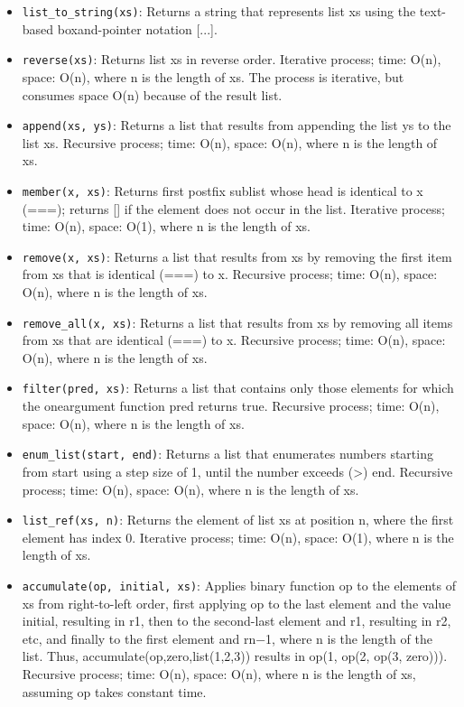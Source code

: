 \documentclass[a4paper]{article} \usepackage[backend=biber, style=numeric, sorting=none]{biblatex}
\begin{document}
\begin{multicols*}{4}
\begin{itemize}
\item \texttt{list\_to\_string(xs)}: Returns a string that represents list xs using the text-based boxand-pointer notation [...].
\item \texttt{reverse(xs)}: Returns list xs in reverse order. Iterative process; time: O(n), space: O(n), where n is the length of xs. The process is iterative, but consumes space O(n) because of the result list.
\item \texttt{append(xs, ys)}: Returns a list that results from appending the list ys to the list xs. Recursive process; time: O(n), space: O(n), where n is the length of xs.
\item \texttt{member(x, xs)}: Returns first postfix sublist whose head is identical to x (===); returns [] if the element does not occur in the list. Iterative process; time: O(n), space: O(1), where n is the length of xs.
\item \texttt{remove(x, xs)}: Returns a list that results from xs by removing the first item from xs that is identical (===) to x. Recursive process; time: O(n), space: O(n), where n is the length of xs.
\item \texttt{remove\_all(x, xs)}: Returns a list that results from xs by removing all items from xs that are identical (===) to x. Recursive process; time: O(n), space: O(n), where n is the length of xs.
\item \texttt{filter(pred, xs)}: Returns a list that contains only those elements for which the oneargument function pred returns true. Recursive process; time: O(n), space: O(n), where n is the length of xs.
\item \texttt{enum\_list(start, end)}: Returns a list that enumerates numbers starting from start using a step size of 1, until the number exceeds (>) end. Recursive process; time: O(n), space: O(n), where n is the length of xs.
\item \texttt{list\_ref(xs, n)}: Returns the element of list xs at position n, where the first element has index 0. Iterative process; time: O(n), space: O(1), where n is the length of xs.
\item \texttt{accumulate(op, initial, xs)}: Applies binary function op to the elements of xs from right-to-left order, first applying op to the last element and the value initial, resulting in r1, then to the second-last element and r1, resulting in r2, etc, and finally to the first element and rn−1, where n is the length of the list. Thus, accumulate(op,zero,list(1,2,3)) results in op(1, op(2, op(3, zero))). Recursive process; time: O(n), space: O(n), where n is the length of xs, assuming op takes constant time.
\end{itemize}


\end{multicols*}
\end{document}
